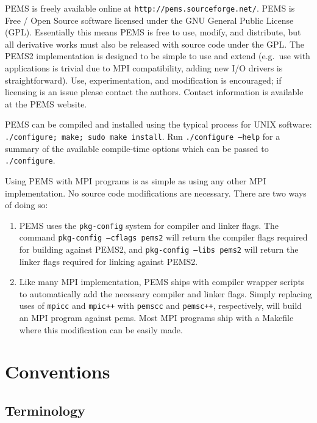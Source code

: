 \documentclass[12pt]{carletoncsthesis}
\begin{document}
PEMS is freely available online at {\tt http://pems.sourceforge.net/}.
PEMS is Free / Open Source software licensed under the GNU General Public
License (GPL).  Essentially this means PEMS is free to use, modify, and
distribute, but all derivative works must also be released with source code
under the GPL.  The PEMS2 implementation is designed to be simple to use
and extend (e.g.\ use with applications is trivial due to MPI compatibility,
adding new I/O drivers is straightforward).  Use, experimentation, and
modification is encouraged; if licensing is an issue please contact the
authors.  Contact information is available at the PEMS website.

PEMS can be compiled and installed using the typical process for UNIX software:
{\tt ./configure; make; sudo make install}.  Run {\tt ./configure --help}
for a summary of the available compile-time options which can be passed to
{\tt ./configure}.

Using PEMS with MPI programs is as simple as using any other MPI
implementation.  No source code modifications are necessary.  There are two
ways of doing so:
\begin{enumerate}
\item PEMS uses the {\tt pkg-config} system for compiler and linker flags.
The command {\tt pkg-config --cflags pems2} will return the compiler flags
required for building against PEMS2, and {\tt pkg-config --libs pems2}
will return the linker flags required for linking against PEMS2.
\item Like many MPI implementation, PEMS ships with compiler wrapper scripts to
automatically add the necessary compiler and linker flags.  Simply replacing
uses of {\tt mpicc} and {\tt mpic++} with {\tt pemscc} and {\tt pemsc++},
respectively, will build an MPI program against pems.  Most MPI programs ship
with a Makefile where this modification can be easily made.
\end{enumerate}

\chapter{Conventions}
\thispagestyle{empty}
\label{conventions}


\section{Terminology}
\end{document}
